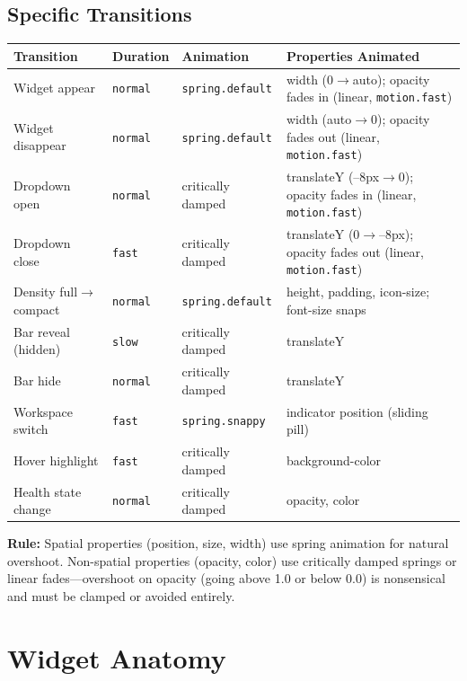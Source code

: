 \documentclass[11pt,a4paper]{article}
\begin{document}
\subsection{Specific Transitions}

\begin{longtable}{p{3.8cm} p{2.2cm} p{2.5cm} p{4.5cm}}
\toprule
\textbf{Transition} & \textbf{Duration} & \textbf{Animation} & \textbf{Properties Animated} \\
\midrule
Widget appear & \texttt{normal} & \texttt{spring.default} & width (0$\to$auto); opacity fades in (linear, \texttt{motion.fast}) \\
Widget disappear & \texttt{normal} & \texttt{spring.default} & width (auto$\to$0); opacity fades out (linear, \texttt{motion.fast}) \\
Dropdown open & \texttt{normal} & critically damped & translateY (--8px$\to$0); opacity fades in (linear, \texttt{motion.fast}) \\
Dropdown close & \texttt{fast} & critically damped & translateY (0$\to$--8px); opacity fades out (linear, \texttt{motion.fast}) \\
Density full$\to$compact & \texttt{normal} & \texttt{spring.default} & height, padding, icon-size; font-size snaps \\
Bar reveal (hidden) & \texttt{slow} & critically damped & translateY \\
Bar hide & \texttt{normal} & critically damped & translateY \\
Workspace switch & \texttt{fast} & \texttt{spring.snappy} & indicator position (sliding pill) \\
Hover highlight & \texttt{fast} & critically damped & background-color \\
Health state change & \texttt{normal} & critically damped & opacity, color \\
\bottomrule
\end{longtable}

\textbf{Rule:} Spatial properties (position, size, width) use spring animation for natural overshoot. Non-spatial properties (opacity, color) use critically damped springs or linear fades---overshoot on opacity (going above 1.0 or below 0.0) is nonsensical and must be clamped or avoided entirely.


\section{Widget Anatomy}
\label{sec:widgets}
\end{document}
